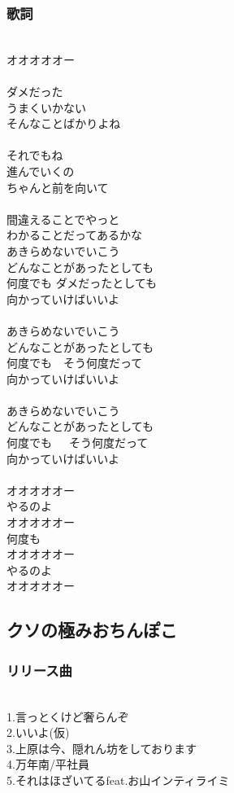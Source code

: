\subsubsection{歌詞}
\ \\ 
オオオオオー\\
\\
ダメだった\\
うまくいかない\\
そんなことばかりよね\\
\\
それでもね\\
進んでいくの\\
ちゃんと前を向いて\\
\\
間違えることでやっと\\
わかることだってあるかな\\
あきらめないでいこう\\
どんなことがあったとしても\\
何度でも ダメだったとしても\\
向かっていけばいいよ\\
\\
あきらめないでいこう\\
どんなことがあったとしても\\
何度でも　そう何度だって\\
向かっていけばいいよ\\
\\
あきらめないでいこう\\
どんなことがあったとしても\\
何度でも　\ そう何度だって\\
向かっていけばいいよ\\
 \\
オオオオオー\\
やるのよ\\
オオオオオー\\
何度も\\
オオオオオー\\
やるのよ\\
オオオオオー\\

\subsection{クソの極みおちんぽこ}
\subsubsection{リリース曲}
　\\
1.言っとくけど奢らんぞ\\
2.いいよ(仮)\\
3.上原は今、隠れん坊をしております\\
4.万年南/平社員\\
5.それはほざいてるfeat.お山インティライミ\\

